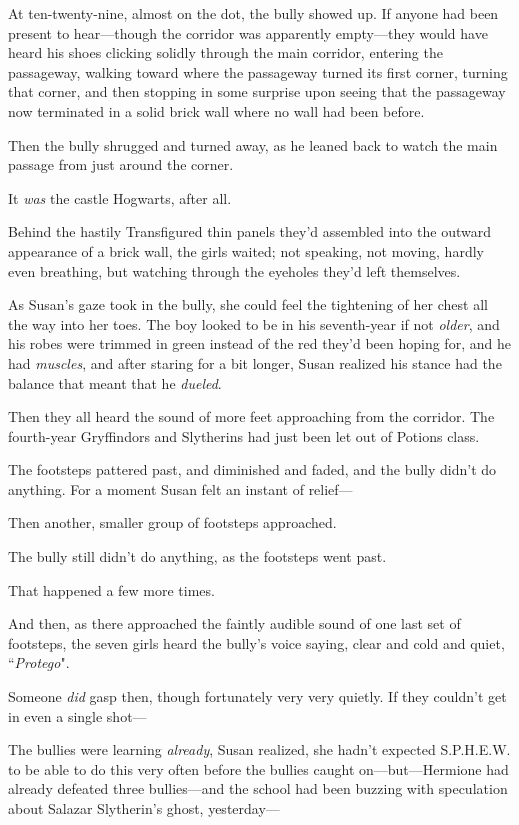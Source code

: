 \later

At ten-twenty-nine, almost on the dot, the bully showed up. If anyone had been present to hear—though the corridor was apparently empty—they would have heard his shoes clicking solidly through the main corridor, entering the passageway, walking toward where the passageway turned its first corner, turning that corner, and then stopping in some surprise upon seeing that the passageway now terminated in a solid brick wall where no wall had been before.

Then the bully shrugged and turned away, as he leaned back to watch the main passage from just around the corner.

It \emph{was} the castle Hogwarts, after all.

Behind the hastily Transfigured thin panels they'd assembled into the outward appearance of a brick wall, the girls waited; not speaking, not moving, hardly even breathing, but watching through the eyeholes they'd left themselves.

As Susan's gaze took in the bully, she could feel the tightening of her chest all the way into her toes. The boy looked to be in his seventh-year if not \emph{older}, and his robes were trimmed in green instead of the red they'd been hoping for, and he had \emph{muscles}, and after staring for a bit longer, Susan realized his stance had the balance that meant that he \emph{dueled}.

Then they all heard the sound of more feet approaching from the corridor. The fourth-year Gryffindors and Slytherins had just been let out of Potions class.

The footsteps pattered past, and diminished and faded, and the bully didn't do anything. For a moment Susan felt an instant of relief—

Then another, smaller group of footsteps approached.

The bully still didn't do anything, as the footsteps went past.

That happened a few more times.

And then, as there approached the faintly audible sound of one last set of footsteps, the seven girls heard the bully's voice saying, clear and cold and quiet, ``\emph{Protego}".

Someone \emph{did} gasp then, though fortunately very very quietly. If they couldn't get in even a single shot—

The bullies were learning \emph{already}, Susan realized, she hadn't expected S.P.H.E.W. to be able to do this very often before the bullies caught on—but—Hermione had already defeated three bullies—and the school had been buzzing with speculation about Salazar Slytherin's ghost, yesterday—

